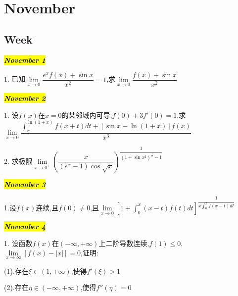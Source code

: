 \chapter{November}
\section{Week }
\hl{\textbf{\textit{November 1}}}

1. 已知$\lim\limits_{x\rightarrow 0}\dfrac{e^{x}f(x)+\sin x}{x^{2}}=1$,求$\lim\limits_{x\rightarrow 0}\dfrac{f(x)+\sin x}{x^{2}}$
\begin{solution}
	
\end{solution}

\hl{\textbf{\textit{November 2}}}

1. 设$f(x)$在$x=0$的某邻域内可导,$f(0)+3f'(0)=1$,求$\lim\limits_{x\rightarrow 0}\dfrac{\int_{x}^{\ln(1+x)}f(x+t)dt+[\sin x-\ln(1+x)]f(x)}{x^{3}}$
\begin{solution}
	
\end{solution}

2. 求极限$\lim\limits_{x\rightarrow 0^{+}}\left(\dfrac{x}{(e^{x}-1)\cos\sqrt{x}}\right)^{\dfrac{1}{(1+\sin x^{2})^{\frac{1}{x}}-1}}$
\begin{solution}
	
\end{solution}

\hl{\textbf{\textit{November 3}}}

1.设$f(x)$连续,且$f(0)\neq 0$,且$\lim\limits_{x\rightarrow 0}\left[1+\int_{0}^{x}(x-t)f(t)dt \right]^{\dfrac{1}{x\int_{0}^{x}f(x-t)dt}}$
\begin{solution}
	
\end{solution}

\hl{\textbf{\textit{November 4}}}

1. 设函数$f(x)$在$(-\infty,+\infty)$上二阶导数连续,$f(1)\leq 0$,$\lim\limits_{x\rightarrow \infty}\left[ f(x)-|x|\right]=0$,证明:

(1).存在$\xi\in(1,+\infty)$,使得$f'(\xi)>1$

(2).存在$\eta\in(-\infty,+\infty)$,使得$f''(\eta)=0$
\begin{solution}
	
\end{solution}


